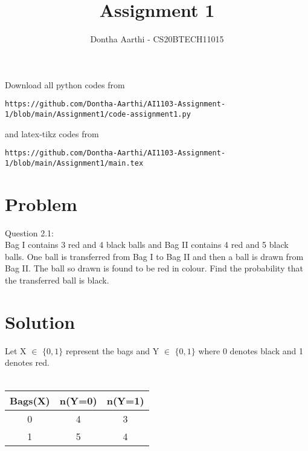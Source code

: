 \documentclass[journal,12pt,twocolumn]{IEEEtran}
\begin{document}
     \def\rightbox#1{\makebox[0in][r]{#1}}
     \def\centbox#1{\makebox[0in]{#1}}
     \def\topbox#1{\raisebox{-\baselineskip}[0in][0in]{#1}}
     \def\midbox#1{\raisebox{-0.5\baselineskip}[0in][0in]{#1}}
\vspace{3cm}
\title{Assignment 1}
\author{Dontha Aarthi - CS20BTECH11015}
\maketitle
\newpage
\bigskip
\renewcommand{\thefigure}{\theenumi}
\renewcommand{\thetable}{\theenumi}
Download all python codes from 
\begin{lstlisting}
https://github.com/Dontha-Aarthi/AI1103-Assignment-1/blob/main/Assignment1/code-assignment1.py
\end{lstlisting}
%
and latex-tikz codes from 
%
\begin{lstlisting}
https://github.com/Dontha-Aarthi/AI1103-Assignment-1/blob/main/Assignment1/main.tex
\end{lstlisting}
\section{Problem}
Question 2.1:\\
Bag I contains 3 red and 4 black balls and
Bag II contains 4 red and 5 black balls. One
ball is transferred from Bag I to Bag II and
then a ball is drawn from Bag II. The ball
so drawn is found to be red in colour. Find
the probability that the transferred ball is black.


\section{Solution}

Let X $\in$ $ \{0,1\} $ represent the bags and Y $\in$ $\{0,1\}$ where 0 denotes black and 1 denotes red.\\\\
\begin{centre}
 \begin{tabular}{|c|c|c|}
    \hline
    Bags(X) & n(Y=0) & n(Y=1)  \\
    \hline
     0 & 4 & 3\\
    \hline
     1 & 5 & 4\\
     \hline
 \end{tabular}
\end{centre}
\end{document}
